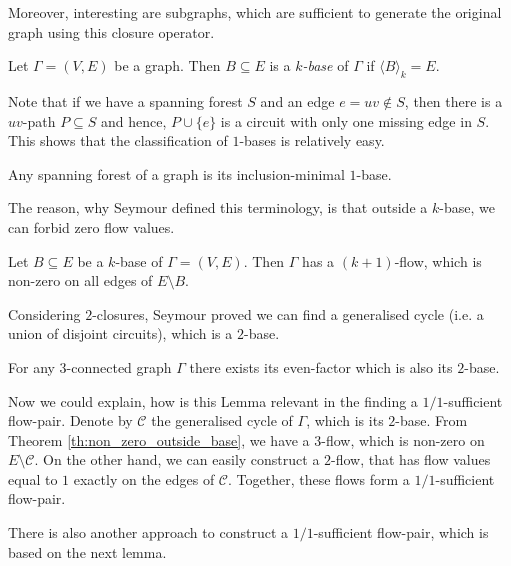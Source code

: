 Moreover, interesting are subgraphs, which are sufficient to generate the original graph using this closure operator.

\begin{definition} \cite[p. 7]{group_connectivity_enumeration}
	Let $\Gamma=(V,E)$ be a graph. Then $B\subseteq E$ is a \emph{$k$-base} of $\Gamma$ if $\langle B\rangle_k = E$.
\end{definition}

Note that if we have a spanning forest $S$ and an edge $e=uv\not\in S$, then there is a $uv$-path $P\subseteq S$ and hence, $P\cup\{e\}$ is a circuit with only one missing edge in $S$. This shows that the classification of $1$-bases is relatively easy. 

\begin{claim}
	Any spanning forest of a graph is its inclusion-minimal $1$-base.
\end{claim}

The reason, why Seymour defined this terminology, is that outside a $k$-base, we can forbid zero flow values.

\begin{theorem} \emph{\cite[p. 132]{seymour}}
	Let $B\subseteq E$ be a $k$-base of $\Gamma=(V,E)$. Then $\Gamma$ has a $(k+1)$-flow, which is non-zero on all edges of $E\setminus B$.\label{th:non_zero_outside_base}
\end{theorem}

Considering $2$-closures, Seymour proved we can find a generalised cycle (i.e. a union of disjoint circuits), which is a $2$-base.

\begin{lemma} \emph{\cite[p. 133]{seymour}}
	For any $3$-connected graph $\Gamma$ there exists its even-factor which is also its $2$-base.\label{lem:cycle_2_base}
\end{lemma}

Now we could explain, how is this Lemma relevant in the finding a $1/1$-sufficient flow-pair. Denote by $\mathcal C$ the generalised cycle of $\Gamma$, which is its $2$-base. From Theorem \ref{th:non_zero_outside_base}, we have a $3$-flow, which is non-zero on $E\setminus\mathcal C$. On the other hand, we can easily construct a $2$-flow, that has flow values equal to $1$ exactly on the edges of $\mathcal C$. Together, these flows form a $1/1$-sufficient flow-pair.

There is also another approach to construct a $1/1$-sufficient flow-pair, which is based on the next lemma. 

